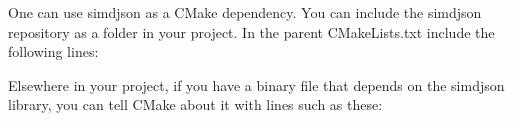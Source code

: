 One can use simdjson as a C\+Make dependency. You can include the simdjson repository as a folder in your project. In the parent {\ttfamily C\+Make\+Lists.\+txt} include the following lines\+:


\begin{DoxyCode}{0}
\end{DoxyCode}


Elsewhere in your project, if you have a binary file that depends on the simdjson library, you can tell C\+Make about it with lines such as these\+:


\begin{DoxyCode}{0}
\DoxyCodeLine{}
\end{DoxyCode}
 
